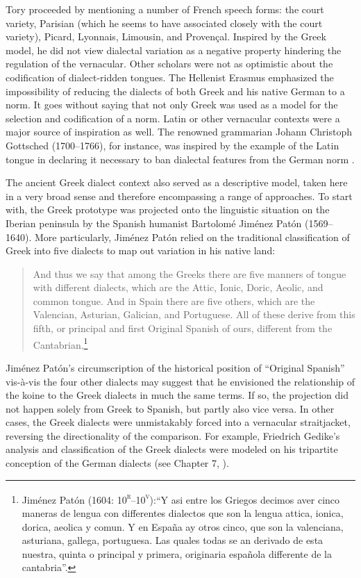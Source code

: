 Tory proceeded by mentioning a number of French speech forms: the court variety, Parisian (which he seems to have associated closely with the court variety), Picard, Lyonnais, Limousin, and Provençal. Inspired by the Greek model, he did not view dialectal variation as a negative property hindering the regulation of the vernacular. Other scholars were not as optimistic about the codification of dialect-ridden tongues. The Hellenist Erasmus \citet[239]{Schmidt1615} emphasized the impossibility of reducing the dialects of both Greek and his native German to a norm. It goes without saying that not only Greek was used as a model for the selection and codification of a norm. Latin or other vernacular contexts were a major source of inspiration as well. The renowned grammarian Johann Christoph Gottsched (1700–1766), for instance, was inspired by the example of the Latin tongue in declaring it necessary to ban dialectal features from the German norm \citep[334]{Gottsched1748}.

The ancient Greek dialect context also served as a descriptive model, taken here in a very broad sense and therefore encompassing a range of approaches. To start with, the Greek prototype was projected onto the linguistic situation on the Iberian peninsula by the Spanish humanist Bartolomé Jiménez Patón (1569–1640). More particularly, Jiménez Patón relied on the traditional classification of Greek into five dialects to map out variation in his native land:

\begin{quote}
And thus we say that among the Greeks there are five manners of tongue with different dialects, which are the Attic, Ionic, Doric, Aeolic, and common tongue. And in Spain there are five others, which are the Valencian, Asturian, Galician, and Portuguese. All of these derive from this fifth, or principal and first Original Spanish of ours, different from the Cantabrian.\footnote{Jiménez Patón (1604: 10\textsc{\textsuperscript{r}}\textsc{–10}\textsc{\textsuperscript{v}}):“Y asi entre los Griegos decimos aver cinco maneras de lengua con differentes dialectos que son la lengua attica, ionica, dorica, aeolica y comun. Y en España ay otros cinco, que son la valenciana, asturiana, gallega, portuguesa. Las quales todas se an derivado de esta nuestra, quinta o principal y primera, originaria española differente de la cantabria”.}
\end{quote}

Jiménez Patón’s circumscription of the historical position of “Original Spanish” vis-à-vis the four other dialects may suggest that he envisioned the relationship of the koine to the Greek dialects in much the same terms. If so, the projection did not happen solely from Greek to Spanish, but partly also vice versa. In other cases, the Greek dialects were unmistakably forced into a vernacular straitjacket, reversing the directionality of the comparison. For example, Friedrich Gedike’s analysis and classification of the Greek dialects were modeled on his tripartite conception of the German dialects (see Chapter 7, ).

